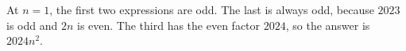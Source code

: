 At $n=1$, the first two expressions are odd. The last is always odd, because $2023$ is odd and $2n$ is even. The third has the even factor $2024$, so the answer is $\boxed{2024n^2}$.
